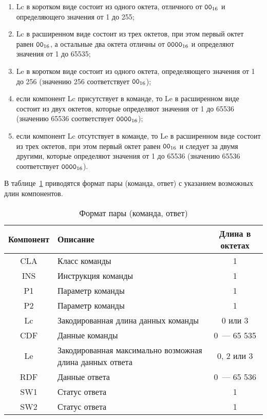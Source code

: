 \begin{enumerate}
\item[1)]
Lc в коротком виде состоит из одного октета, отличного от $\texttt{00}_{16}$ и 
определяющего значения от 1 до 255; 

\item[2)] 
Lc в расширенном виде состоит из трех октетов, при этом первый октет 
равен $\texttt{00}_{16}$, а остальные два октета отличны от 
$\texttt{0000}_{16}$ и определяют значения от 1 до 65535; 

\item[3)] 
Le в коротком виде состоит из одного октета, определяющего значения 
от 1 до 256 (значению 256 соответствует $\texttt{00}_{16}$); 

\item[4)] 
если компонент Lc присутствует в команде, то Le в расширенном виде 
состоит из двух октетов, которые определяют значения от 1 до 65536 
(значению 65536 соответствует $\texttt{0000}_{16}$); 

\item[5)] 
если компонент Lc отсутствует в команде, то Le в расширенном виде 
состоит из трех октетов, при этом первый октет равен $\texttt{00}_{16}$ и 
следует за двумя другими, которые определяют значения от 1 до 65536 
(значению 65536 соответствует $\texttt{0000}_{16}$). 
\end{enumerate}

В таблице~\ref{Table.CMDS.Fmt} приводятся формат пары (команда, ответ) 
с указанием возможных длин компонентов.

\begin{table}[h]
\caption{Формат пары (команда, ответ)}\label{Table.CMDS.Fmt}
\begin{tabular}{|c|p{10.5cm}|c|}
\hline
Компонент & Описание & Длина в октетах \\
\hline
\hline
CLA & Класс команды & 1 \\
\hline
INS & Инструкция команды & 1 \\
\hline
P1 & Параметр команды & 1 \\
\hline
P2 & Параметр команды & 1 \\
\hline
Lc & Закодированная длина данных команды & 0 или 3  \\
\hline
CDF & Данные команды & 0~--- 65 535 \\
\hline
Le & Закодированная максимально возможная длина данных ответа & 0, 2 или 3 
\\
\hline
RDF & Данные ответа & 0~--- 65 536 \\
\hline
SW1 & Статус ответа & 1 \\
\hline
SW2 & Статус ответа & 1 \\
\hline
\end{tabular}
\end{table}

